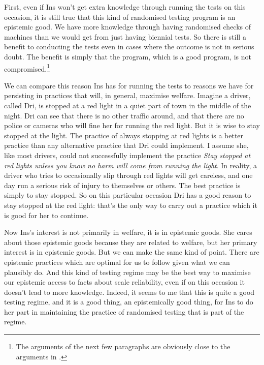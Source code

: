 First, even if \gls{Ins} won't get extra knowledge through running the tests on this occasion, it is still true that this kind of randomised testing program is an epistemic good. We have more knowledge through having randomised checks of machines than we would get from just having biennial tests. So there is still a benefit to conducting the tests even in cases where the outcome is not in serious doubt. The benefit is simply that the program, which is a good program, is not compromised.\footnote{The arguments of the next few paragraphs are obviously close to the arguments in \citet{HawthorneSrinivasan2013}.}

We can compare this reason \gls{Ins} has for running the tests to reasons we have for persisting in practices that will, in general, maximise welfare. Imagine a driver, called \gls{Dri}, is stopped at a red light in a quiet part of town in the middle of the night. \gls{Dri} can see that there is no other traffic around, and that there are no police or cameras who will fine her for running the red light. But it is wise to stay stopped at the light. The practice of always stopping at red lights is a better practice than any alternative practice that \gls{Dri} could implement. I assume she, like most drivers, could not successfully implement the practice \emph{Stay stopped at red lights unless you know no harm will come from running the light}. In reality, a driver who tries to occasionally slip through red lights will get careless, and one day run a serious risk of injury to themselves or others. The best practice is simply to stay stopped. So on this particular occasion \gls{Dri} has a good reason to stay stopped at the red light: that's the only way to carry out a practice which it is good for her to continue.

Now \gls{Ins}'s interest is not primarily in welfare, it is in epistemic goods. She cares about those epistemic goods because they are related to welfare, but her primary interest is in epistemic goods. But we can make the same kind of point. There are epistemic practices which are optimal for us to follow given what we can plausibly do. And this kind of testing regime may be the best way to maximise our epistemic access to facts about scale reliability, even if on this occasion it doesn't lead to more knowledge. Indeed, it seems to me that this is quite a good testing regime, and it is a good thing, an epistemically good thing, for \gls{Ins} to do her part in maintaining the practice of randomised testing that is part of the regime.

